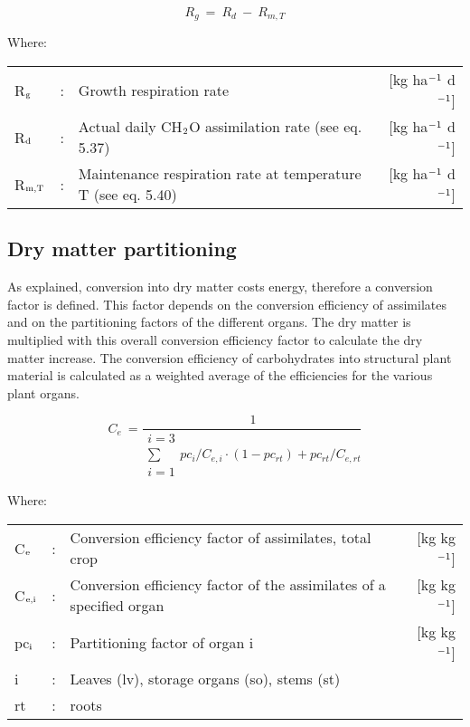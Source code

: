 \begin{equation}
R _{g} ~=~ R _{d} ~-~ R _{m,T} 
\end{equation}

Where:\\[5pt]
\begin{tabularx}{\textwidth}{llXr}
R$_{{\rm g}}$ &:& Growth respiration rate   &     [kg ha$^{{\rm -1}}$ d$^{{\rm -1}}$]\\
R$_{{\rm d}}$ &:& Actual daily CH$_{{\rm 2}}$O assimilation rate (see eq. 5.37)   &   
    [kg ha$^{{\rm -1}}$ d$^{{\rm -1}}$]\\
R$_{{\rm m,T}}$ &:& Maintenance respiration rate at 
    temperature T (see eq. 5.40)   &     [kg ha$^{{\rm -1}}$ d$^{{\rm -1}}$]\\
\end{tabularx}

\subsection{Dry matter partitioning  }

As explained, conversion into dry matter costs energy, therefore a conversion factor is
defined. This factor depends on the conversion efficiency of assimilates and on the
partitioning factors of the different organs. The dry matter is multiplied with this overall
conversion efficiency factor to calculate the dry matter increase. The conversion 
efficiency of carbohydrates into structural plant material is calculated as a weighted average
of the efficiencies for the various plant organs.

\begin{equation}
C _{e} ~={\frac{~1}{
        \begin{array}{c}
        {i=3}  \\
        \sum  \\
        {i=1}
        \end{array} {pc_{i}}/{C_{e,i}} \cdot (1-pc_{rt} ) + {pc_{rt}}/{C_{e,rt}} 
        }}
\end{equation}

Where:\\[5pt]
\begin{tabularx}{\textwidth}{llXr}
C$_{{\rm e}}$ &:& Conversion efficiency factor of assimilates, total crop  &   
    [kg kg$^{{\rm -1}}$]\\
C$_{{\rm e,i}}$ &:& Conversion efficiency factor of the assimilates 
    of a specified organ  &      [kg kg$^{{\rm -1}}$]\\
pc$_{{\rm i}}$ &:& Partitioning factor of organ i   &
     [kg kg$^{{\rm -1}}$]\\
i &:& Leaves (lv), storage organs (so), stems (st)\\
rt &:& roots\\
\end{tabularx}

